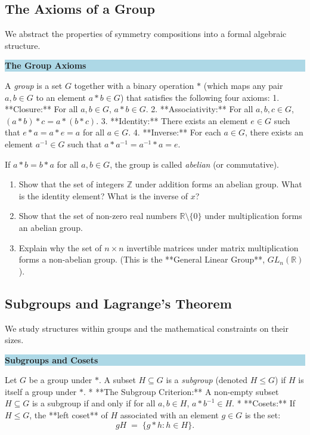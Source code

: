 \documentclass[12pt, a4paper]{article}
\newenvironment{namedconcept}[1]
  {\par\medskip\fillcolorbox{LightBlue}{NavyBlue}{#1}}
  {\par\medskip}
\newcommand{\fillcolorbox}[3]{%
  \noindent
  \filldrawbox{#1}{#2}{\textbf{\sffamily\color{white}#3}}\par\nobreak\vspace{4pt}
}
\newcommand{\filldrawbox}[3]{%
  \colorbox{#1}{\parbox{\dimexpr\linewidth-2\fboxsep\relax}{%
    \vspace{4pt}\noindent\hspace{4pt}#3\vspace{4pt}%
  }}%
}
\newcommand{\newterm}[1]{\textit{\textcolor{DiscoveryColor}{#1}}}
\begin{document}
\subsection{The Axioms of a Group}

We abstract the properties of symmetry compositions into a formal algebraic structure.

\begin{namedconcept}{The Group Axioms}
A \newterm{group} is a set $G$ together with a binary operation $*$ (which maps any pair $a, b \in G$ to an element $a * b \in G$) that satisfies the following four axioms:
1. **Closure:** For all $a, b \in G$, $a * b \in G$.
2. **Associativity:** For all $a, b, c \in G$, $(a * b) * c = a * (b * c)$.
3. **Identity:** There exists an element $e \in G$ such that $e * a = a * e = a$ for all $a \in G$.
4. **Inverse:** For each $a \in G$, there exists an element $a^{-1} \in G$ such that $a * a^{-1} = a^{-1} * a = e$.

If $a * b = b * a$ for all $a, b \in G$, the group is called \newterm{abelian} (or commutative).
\end{namedconcept}

\begin{enumerate}[label=(\alph*), leftmargin=*]
  \item Show that the set of integers $\mathbb{Z}$ under addition forms an abelian group. What is the identity element? What is the inverse of $x$?
  \item Show that the set of non-zero real numbers $\mathbb{R} \setminus \{0\}$ under multiplication forms an abelian group.
  \item Explain why the set of $n \times n$ invertible matrices under matrix multiplication forms a non-abelian group. (This is the **General Linear Group**, $GL_n(\mathbb{R})$).
\end{enumerate}

\subsection{Subgroups and Lagrange's Theorem}

We study structures within groups and the mathematical constraints on their sizes.

\begin{namedconcept}{Subgroups and Cosets}
Let $G$ be a group under $*$. A subset $H \subseteq G$ is a \newterm{subgroup} (denoted $H \le G$) if $H$ is itself a group under $*$.
* **The Subgroup Criterion:** A non-empty subset $H \subseteq G$ is a subgroup if and only if for all $a, b \in H$, $a * b^{-1} \in H$.
* **Cosets:** If $H \le G$, the **left coset** of $H$ associated with an element $g \in G$ is the set:
  \[
    gH \;=\; \{g * h : h \in H\}.
  \]
\end{namedconcept}
\end{document}
